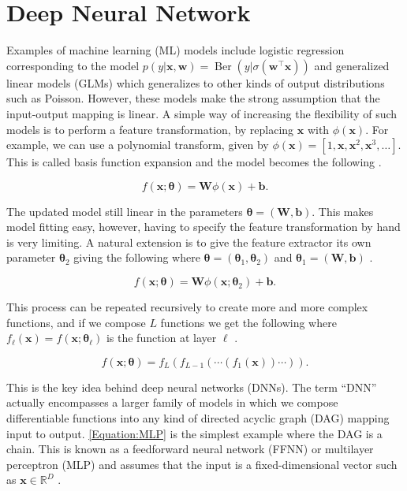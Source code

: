 \documentclass[../../../main.tex]{subfiles}
\begin{document}
\section{Deep Neural Network}\label{Appendix:DNN}

Examples of machine learning (ML) models include logistic regression corresponding to the model $p(y|\bm{x},\bm{w})=\operatorname{Ber}(y|\sigma(\bm{w}^\top\bm{x}))$ and generalized linear models (GLMs) which generalizes to other kinds of output distributions such as Poisson. However, these models make the strong assumption that the input-output mapping is linear. A simple way of increasing the flexibility of such models is to perform a feature transformation, by replacing $\bm{x}$ with $\phi(\bm{x})$. For example, we can use a polynomial transform, given by $\phi(\bm{x})=[1,\bm{x},\bm{x}^2,\bm{x}^3,\ldots]$. This is called basis function expansion and the model becomes the following \autocite{Murphy2022}.

\begin{equation}
f(\bm{x};\bm{\theta})=\bm{W}\phi(\bm{x})+\bm{b}.
\end{equation}

The updated model still linear in the parameters $\bm{\theta}=(\bm{W},\bm{b})$. This makes model fitting easy, however, having to specify the feature transformation by hand is very limiting. A natural extension is to give the feature extractor its own parameter $\bm{\theta}_2$ giving the following where $\bm{\theta}=(\bm{\theta}_1,\bm{\theta}_2)$ and $\bm{\theta}_1=(\bm{W},\bm{b})$ \autocite{Murphy2022}.

\begin{equation}
f(\bm{x};\bm{\theta})=\bm{W}\phi(\bm{x};\bm{\theta}_2)+\bm{b}.
\end{equation}

This process can be repeated recursively to create more and more complex functions, and if we compose $L$ functions we get the following where $f_\ell(\bm{x})=f(\bm{x};\bm{\theta}_\ell)$ is the function at layer $\ell$ \autocite{Murphy2022}.

\begin{equation}
f(\bm{x};\bm{\theta}) = f_L(f_{L-1}(\cdots (f_1(\bm{x})) \cdots)).
\label{Equation:MLP}
\end{equation}

This is the key idea behind deep neural networks (DNNs). The term ``DNN'' actually encompasses a larger family of models in which we compose differentiable functions into any kind of directed acyclic graph (DAG) mapping input to output. \autoref{Equation:MLP} is the simplest example where the DAG is a chain. This is known as a feedforward neural network (FFNN) or multilayer perceptron (MLP) and assumes that the input is a fixed-dimensional vector such as $\bm{x}\in\mathbb{R}^D$ \autocite{Murphy2022}.
\end{document}
